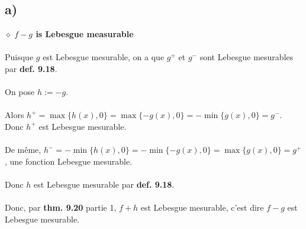 \documentclass[a4paper,10pt]{article}
\begin{document}
\subsection*{a)}
$\diamond$ \textbf{$f-g$ is Lebesgue measurable}
\\
\\
Puisque $g$ est Lebesgue mesurable, on a que $g^+$ et $g^-$ sont Lebesgue mesurables par \textbf{def. 9.18}.
\\
\\
On pose $h := -g$. 
\\
\\
Alors $h^+ = \max \{h(x), 0 \} = \max \{-g(x), 0 \} = - \min \{ g(x), 0 \} = g^-$. Donc $h^+$ est Lebesgue mesurable.
\\
\\
De même, $h^- = - \min \{h(x) , 0 \} = - \min \{ -g(x), 0 \} = \max \{ g(x), 0 \} = g^+$, une fonction Lebesgue mesurable.
\\
\\
Donc $h$ est Lebesgue mesurable par \textbf{def. 9.18}. 
\\
\\
Donc, par \textbf{thm. 9.20} partie 1, $f + h$ est Lebesgue mesurable, c'est dire $f - g$ est Lebesgue mesurable.
\end{document}

